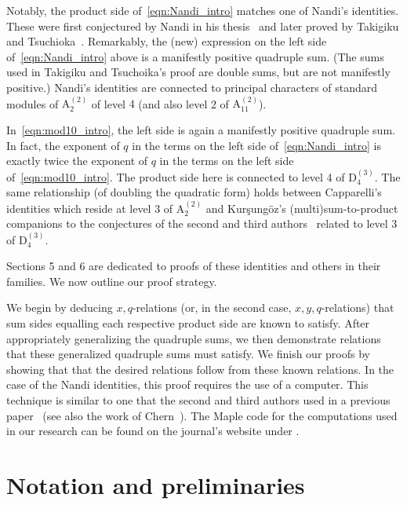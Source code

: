 \documentclass[ALCO,Unicode,published]{cedram}
\begin{document}
Notably, the product side of~\eqref{eqn:Nandi_intro} matches one of Nandi's identities. These were first conjectured by Nandi in his thesis~\cite{Nan-thesis} and later proved by Takigiku and Tsuchioka~\cite{TakTsu-nandi}. Remarkably, the (new) expression on the left side of~\eqref{eqn:Nandi_intro} above is a manifestly positive quadruple sum. (The sums used in Takigiku and Tsuchoika's proof are double sums, but are not manifestly positive.) Nandi's identities are connected to principal characters of standard modules of $\mathrm{A}_2^{(2)}$ of level $4$ (and also level 2 of $\mathrm{A}_{11}^{(2)}$).

In~\eqref{eqn:mod10_intro}, the left side is again a manifestly positive quadruple sum. In fact, the exponent of $q$ in the terms on the left side of~\eqref{eqn:Nandi_intro} is exactly twice the exponent of $q$ in the terms on the left side of~\eqref{eqn:mod10_intro}. The product side here is connected to level 4 of $\mathrm{D}_4^{(3)}$. The same relationship (of doubling the quadratic form) holds between Capparelli's identities \cite{Cap-1,KanRus-stair,Kur-Cap} which reside at level $3$ of $\mathrm{A}_2^{(2)}$ and Kur\c{s}ung\"oz's (multi)sum-to-product companions \cite{Kur-KR} to the conjectures of the second and third authors~\cite{KanRus-idf}  related to level $3$ of $\mathrm{D}_4^{(3)}$.

Sections 5 and 6 are dedicated to proofs of these identities and others in their families. We now outline our proof strategy. 

We begin by deducing $x,q$-relations (or, in the second case, $x,y,q$-relations) that sum sides equalling each respective product side are known to satisfy. After appropriately generalizing the quadruple sums, we then demonstrate relations that these generalized quadruple sums must satisfy. We finish our proofs by showing that that the desired relations follow from these known relations. In the case of the Nandi identities, this proof requires the use of a computer. This technique is similar to one that the second and third authors used in a previous paper~ \cite{KanRus-cylindric} (see also the work of Chern~\cite{Che-linked}). The Maple code for the computations used in our research can be found on the journal's website under \printDOI.
 
\section{Notation and preliminaries}
\label{sec:notations}
\end{document}
